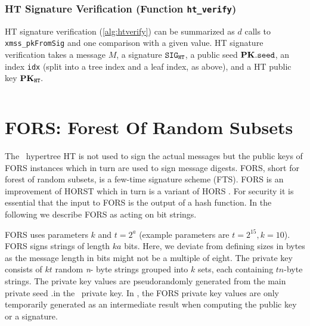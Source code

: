 \begin{algorithm}
    \inputminted[breaklines,linenos,tabsize=2,mathescape,escapeinside=||]{C}{code/ht_sign.cs}
    \caption{\texttt{ht\_sign} --- Generating an HT signature.}
    \label{alg:htsign}
\end{algorithm}

\subsubsection{HT Signature Verification (Function \texttt{ht\_verify})}

HT signature verification (\cref{alg:htverify}) can be summarized as $d$ calls to \texttt{xmss\_pkFromSig} and one comparison with a given value. HT signature verification takes a message $M$, a signature $\mathtt{SIG}_\mathtt{HT}$, a public seed $\mathbf{PK}.\mathtt{seed}$, an index \texttt{idx} (split into a tree index and a leaf index, as above), and a HT public key $\mathbf{PK}_{\mathtt{HT}}.$

\begin{algorithm}
    \inputminted[breaklines,linenos,tabsize=2,mathescape,escapeinside=||]{C}{code/ht_verify.cs}
    \caption{\texttt{ht\_verify} --- Verifying a HT signature $\bf {SIG}_{HT}$ on a message $M$ using a HT public key ${\bf PK}_{HT}$.}
    \label{alg:htverify}
\end{algorithm}
\section{FORS: Forest Of Random Subsets}

The \SPHINCSA\ hypertree HT is not used to sign the actual messages but the public keys of FORS instances which in turn are used to sign message digests. FORS, short for forest of random subsets, is a few-time signature scheme (FTS). FORS is an improvement of HORST \cite{EC:BHHLNP15} which in turn is a variant of HORS \cite{EPRINT:ReyRey02}. For security it is essential that the input to FORS is the output of a hash function. In the following we describe FORS as acting on bit strings.

FORS uses parameters $k$ and $t=2^{a}$ (example parameters are $t=2^{15}, k=10$). FORS signs strings of length $ka$ bits. Here, we deviate from defining sizes in bytes as the message length in bits might not be a multiple of eight. The private key consists of $kt$ random {\it n}- byte strings grouped into $k$ sets, each containing $t n$-byte strings. The private key values are pseudorandomly generated from the main private seed \sk.\seed in the \SPHINCSA\ private key. In \SPHINCSA, the FORS private key values are only temporarily generated as an intermediate result when computing the public key or a signature.

